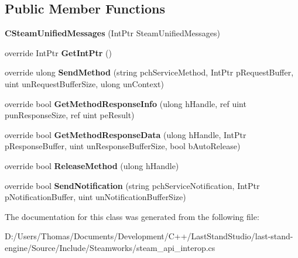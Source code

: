 \subsection*{Public Member Functions}
\begin{DoxyCompactItemize}
\item 
\hypertarget{classValve_1_1Steamworks_1_1CSteamUnifiedMessages_a29b68c12516e1554d0681cec27cb566b}{}{\bfseries C\+Steam\+Unified\+Messages} (Int\+Ptr Steam\+Unified\+Messages)\label{classValve_1_1Steamworks_1_1CSteamUnifiedMessages_a29b68c12516e1554d0681cec27cb566b}

\item 
\hypertarget{classValve_1_1Steamworks_1_1CSteamUnifiedMessages_a173c8fc90b26baddfcbad982c1b1fbe7}{}override Int\+Ptr {\bfseries Get\+Int\+Ptr} ()\label{classValve_1_1Steamworks_1_1CSteamUnifiedMessages_a173c8fc90b26baddfcbad982c1b1fbe7}

\item 
\hypertarget{classValve_1_1Steamworks_1_1CSteamUnifiedMessages_aab9114879c35a4528a28f9c3546c116d}{}override ulong {\bfseries Send\+Method} (string pch\+Service\+Method, Int\+Ptr p\+Request\+Buffer, uint un\+Request\+Buffer\+Size, ulong un\+Context)\label{classValve_1_1Steamworks_1_1CSteamUnifiedMessages_aab9114879c35a4528a28f9c3546c116d}

\item 
\hypertarget{classValve_1_1Steamworks_1_1CSteamUnifiedMessages_a14b06e917ddfa7ee368c1175e76ca6a9}{}override bool {\bfseries Get\+Method\+Response\+Info} (ulong h\+Handle, ref uint pun\+Response\+Size, ref uint pe\+Result)\label{classValve_1_1Steamworks_1_1CSteamUnifiedMessages_a14b06e917ddfa7ee368c1175e76ca6a9}

\item 
\hypertarget{classValve_1_1Steamworks_1_1CSteamUnifiedMessages_a0587e2bdc8bc40269c528b7859247b2a}{}override bool {\bfseries Get\+Method\+Response\+Data} (ulong h\+Handle, Int\+Ptr p\+Response\+Buffer, uint un\+Response\+Buffer\+Size, bool b\+Auto\+Release)\label{classValve_1_1Steamworks_1_1CSteamUnifiedMessages_a0587e2bdc8bc40269c528b7859247b2a}

\item 
\hypertarget{classValve_1_1Steamworks_1_1CSteamUnifiedMessages_ade720abf328f9dea030ad052a1776f1d}{}override bool {\bfseries Release\+Method} (ulong h\+Handle)\label{classValve_1_1Steamworks_1_1CSteamUnifiedMessages_ade720abf328f9dea030ad052a1776f1d}

\item 
\hypertarget{classValve_1_1Steamworks_1_1CSteamUnifiedMessages_a8f02ffe148d064f85fd1f8e8de4ab2fc}{}override bool {\bfseries Send\+Notification} (string pch\+Service\+Notification, Int\+Ptr p\+Notification\+Buffer, uint un\+Notification\+Buffer\+Size)\label{classValve_1_1Steamworks_1_1CSteamUnifiedMessages_a8f02ffe148d064f85fd1f8e8de4ab2fc}

\end{DoxyCompactItemize}


The documentation for this class was generated from the following file\+:\begin{DoxyCompactItemize}
\item 
D\+:/\+Users/\+Thomas/\+Documents/\+Development/\+C++/\+Last\+Stand\+Studio/last-\/stand-\/engine/\+Source/\+Include/\+Steamworks/steam\+\_\+api\+\_\+interop.\+cs\end{DoxyCompactItemize}
